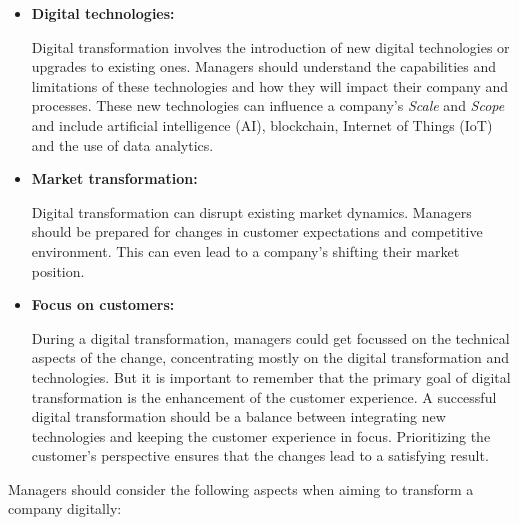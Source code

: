 \documentclass[a4]{scrartcl}
\begin{document}
\begin{itemize}
	
	\item \textbf{Digital technologies:} 
	
	Digital transformation involves the introduction of new digital technologies or upgrades to existing ones. Managers should understand the capabilities and limitations of these technologies and how they will impact their company and processes. These new technologies can influence a company's \textit{Scale} and \textit{Scope} and include artificial intelligence (AI), blockchain, Internet of Things (IoT) and the use of data analytics.~\cite{AI,DDDM, iot, blockchain}
	
	
	\item \textbf{Market transformation:} 
	
	Digital transformation can disrupt existing market dynamics. Managers should be prepared for changes in customer expectations and competitive environment. This can even lead to a company's shifting their market position. \cite{digitalmatrix, vial, DTOT, leadingdigital}
	
	
	\item \textbf{Focus on customers:} 
	
	During a digital transformation, managers could get focussed on the technical aspects of the change, concentrating mostly on the digital transformation and technologies. But it is important to remember that the primary goal of  digital transformation is the enhancement of the customer experience. 
	A successful digital transformation should be a balance between integrating new technologies and keeping the customer experience in focus. Prioritizing the customer's perspective ensures that the changes lead to a satisfying result.~\cite{wiwi}
	
	
\end{itemize}

Managers should consider the following aspects when aiming to transform a company digitally:
\end{document}
